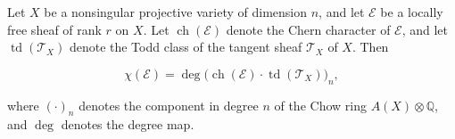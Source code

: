 Let $X$ be a nonsingular projective variety of dimension $n$, and let $\mathcal{E}$ be a locally free sheaf of rank $r$ on $X$. Let $\operatorname{ch}(\mathcal{E})$ denote the Chern character of $\mathcal{E}$, and let $\operatorname{td}(\mathcal{T}_X)$ denote the Todd class of the tangent sheaf $\mathcal{T}_X$ of $X$. Then

$$\chi(\mathcal{E}) = \deg\bigl(\operatorname{ch}(\mathcal{E}) \cdot \operatorname{td}(\mathcal{T}_X)\bigr)_n,$$

where $(\cdot)_n$ denotes the component in degree $n$ of the Chow ring $A(X) \otimes \mathbb{Q}$, and $\deg$ denotes the degree map.
